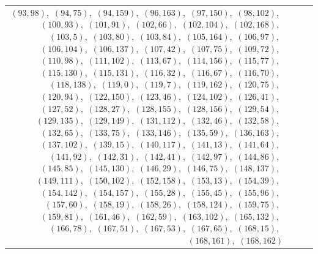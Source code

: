 \documentclass[11pt]{article}
\begin{document}
\begin{longtable}{@{}rrl>{\raggedright\arraybackslash}p{}@{}}
$(93,98)$,\allowbreak\ $(94,75)$,\allowbreak\ $(94,159)$,\allowbreak\ $(96,163)$,\allowbreak\ $(97,150)$,\allowbreak\ $(98,102)$,\allowbreak\ $(100,93)$,\allowbreak\ $(101,91)$,\allowbreak\ $(102,66)$,\allowbreak\ $(102,104)$,\allowbreak\ $(102,168)$,\allowbreak\ $(103,5)$,\allowbreak\ $(103,80)$,\allowbreak\ $(103,84)$,\allowbreak\ $(105,164)$,\allowbreak\ $(106,97)$,\allowbreak\ $(106,104)$,\allowbreak\ $(106,137)$,\allowbreak\ $(107,42)$,\allowbreak\ $(107,75)$,\allowbreak\ $(109,72)$,\allowbreak\ $(110,98)$,\allowbreak\ $(111,102)$,\allowbreak\ $(113,67)$,\allowbreak\ $(114,156)$,\allowbreak\ $(115,77)$,\allowbreak\ $(115,130)$,\allowbreak\ $(115,131)$,\allowbreak\ $(116,32)$,\allowbreak\ $(116,67)$,\allowbreak\ $(116,70)$,\allowbreak\ $(118,138)$,\allowbreak\ $(119,0)$,\allowbreak\ $(119,7)$,\allowbreak\ $(119,162)$,\allowbreak\ $(120,75)$,\allowbreak\ $(120,94)$,\allowbreak\ $(122,150)$,\allowbreak\ $(123,46)$,\allowbreak\ $(124,102)$,\allowbreak\ $(126,41)$,\allowbreak\ $(127,52)$,\allowbreak\ $(128,27)$,\allowbreak\ $(128,155)$,\allowbreak\ $(128,156)$,\allowbreak\ $(129,54)$,\allowbreak\ $(129,135)$,\allowbreak\ $(129,149)$,\allowbreak\ $(131,112)$,\allowbreak\ $(132,46)$,\allowbreak\ $(132,58)$,\allowbreak\ $(132,65)$,\allowbreak\ $(133,75)$,\allowbreak\ $(133,146)$,\allowbreak\ $(135,59)$,\allowbreak\ $(136,163)$,\allowbreak\ $(137,102)$,\allowbreak\ $(139,15)$,\allowbreak\ $(140,117)$,\allowbreak\ $(141,13)$,\allowbreak\ $(141,64)$,\allowbreak\ $(141,92)$,\allowbreak\ $(142,31)$,\allowbreak\ $(142,41)$,\allowbreak\ $(142,97)$,\allowbreak\ $(144,86)$,\allowbreak\ $(145,85)$,\allowbreak\ $(145,130)$,\allowbreak\ $(146,29)$,\allowbreak\ $(146,75)$,\allowbreak\ $(148,137)$,\allowbreak\ $(149,111)$,\allowbreak\ $(150,102)$,\allowbreak\ $(152,158)$,\allowbreak\ $(153,13)$,\allowbreak\ $(154,39)$,\allowbreak\ $(154,142)$,\allowbreak\ $(154,157)$,\allowbreak\ $(155,28)$,\allowbreak\ $(155,45)$,\allowbreak\ $(155,96)$,\allowbreak\ $(157,60)$,\allowbreak\ $(158,19)$,\allowbreak\ $(158,26)$,\allowbreak\ $(158,124)$,\allowbreak\ $(159,75)$,\allowbreak\ $(159,81)$,\allowbreak\ $(161,46)$,\allowbreak\ $(162,59)$,\allowbreak\ $(163,102)$,\allowbreak\ $(165,132)$,\allowbreak\ $(166,78)$,\allowbreak\ $(167,51)$,\allowbreak\ $(167,53)$,\allowbreak\ $(167,65)$,\allowbreak\ $(168,15)$,\allowbreak\ $(168,161)$,\allowbreak\ $(168,162)$\\

\end{longtable}
\end{document}
